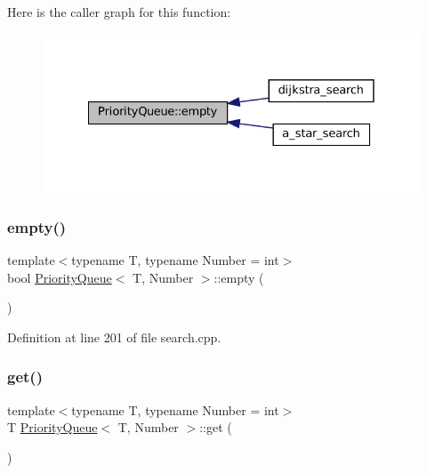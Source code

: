 Here is the caller graph for this function\+:\nopagebreak
\begin{figure}[H]
\begin{center}
\leavevmode
\includegraphics[width=328pt]{struct_priority_queue_a422e38d0c3b8398dc6e4867bb4ceec41_icgraph}
\end{center}
\end{figure}
\mbox{\label{struct_priority_queue_a422e38d0c3b8398dc6e4867bb4ceec41}} 
\subsubsection{\texorpdfstring{empty()}{empty()}\hspace{0.1cm}{\footnotesize\ttfamily [2/2]}}
{\footnotesize\ttfamily template$<$typename T, typename Number = int$>$ \\
bool \mbox{\hyperlink{struct_priority_queue}{Priority\+Queue}}$<$ T, Number $>$\+::empty (\begin{DoxyParamCaption}{ }\end{DoxyParamCaption})\hspace{0.3cm}{\ttfamily [inline]}}



Definition at line 201 of file search.\+cpp.

\mbox{\label{struct_priority_queue_ab211c9583fda5c1a6352021444af5f0e}} 
\subsubsection{\texorpdfstring{get()}{get()}\hspace{0.1cm}{\footnotesize\ttfamily [1/2]}}
{\footnotesize\ttfamily template$<$typename T, typename Number = int$>$ \\
T \mbox{\hyperlink{struct_priority_queue}{Priority\+Queue}}$<$ T, Number $>$\+::get (\begin{DoxyParamCaption}{ }\end{DoxyParamCaption})\hspace{0.3cm}{\ttfamily [inline]}}



